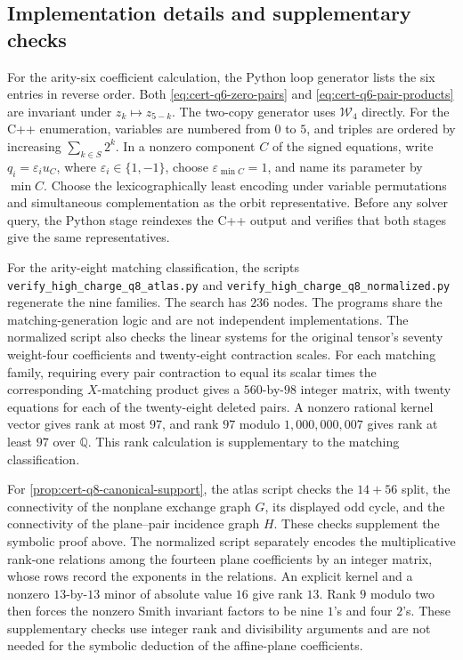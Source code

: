 \documentclass[11pt,letterpaper,onecolumn]{article}
\theoremstyle{plain}
\theoremstyle{definition}
\theoremstyle{remark}
\begin{document}
	
	
\subsection{Implementation details and supplementary checks}
\label{subsec:certificate-supplementary}

For the arity-six coefficient calculation, the Python loop generator lists
the six entries in reverse order. Both
\eqref{eq:cert-q6-zero-pairs} and \eqref{eq:cert-q6-pair-products} are
invariant under \(z_k\mapsto z_{5-k}\). The two-copy generator uses
\(\mathcal W_4\) directly.
For the C++ enumeration, variables are numbered from \(0\) to \(5\), and
triples are ordered by increasing \(\sum_{k\in S}2^k\). In a nonzero
component \(C\) of the signed equations, write
\(q_i=\varepsilon_i u_C\), where \(\varepsilon_i\in\{1,-1\}\), choose
\(\varepsilon_{\min C}=1\), and name its parameter by \(\min C\).
Choose the lexicographically least encoding under variable permutations
and simultaneous complementation as the orbit representative. Before any
solver query, the Python stage reindexes the C++ output and verifies that
both stages give the same representatives.

For the arity-eight matching classification, the scripts
\texttt{verify\_high\_charge\_q8\_atlas.py} and
\texttt{verify\_high\_charge\_q8\_normalized.py} regenerate the nine
families. The search has \(236\) nodes. The programs share the
matching-generation logic and are not independent implementations.
The normalized script also checks the linear systems for the original
tensor's seventy weight-four coefficients and twenty-eight contraction
scales. For each matching family, requiring every pair contraction to
equal its scalar times the corresponding \(X\)-matching product gives
a \(560\)-by-\(98\) integer matrix, with twenty equations for each of
the twenty-eight deleted pairs. A nonzero rational kernel vector gives
rank at most \(97\), and rank \(97\) modulo
\(1{,}000{,}000{,}007\) gives rank at least \(97\) over \(\mathbb Q\).
This rank calculation is supplementary to the matching classification.

For \cref{prop:cert-q8-canonical-support}, the atlas script checks the
\(14+56\) split, the connectivity of the nonplane exchange graph \(G\),
its displayed odd cycle, and the connectivity of the plane--pair incidence
graph \(H\). These checks supplement the symbolic proof above.
The normalized script separately encodes the multiplicative rank-one
relations among the fourteen plane coefficients by an integer matrix,
whose rows record the exponents in the relations. An explicit kernel and
a nonzero \(13\)-by-\(13\) minor of absolute value \(16\) give rank
\(13\). Rank \(9\) modulo two then forces the nonzero Smith invariant
factors to be nine \(1\)'s and four \(2\)'s. These supplementary checks
use integer rank and divisibility arguments and are not needed for the
symbolic deduction of the affine-plane coefficients.

\end{document}
